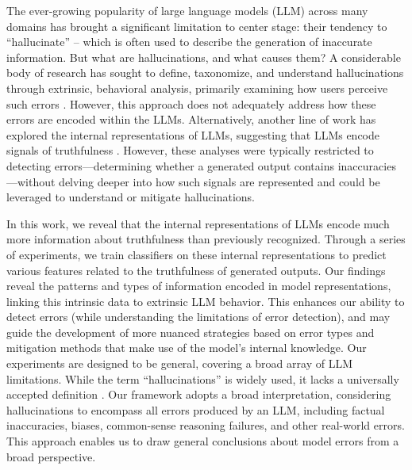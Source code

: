 The ever-growing popularity of large language models (LLM) across many domains has brought a significant limitation to center stage: their tendency to ``hallucinate'' -- which is often used to describe the generation of inaccurate information.
But what are hallucinations, and what causes them?
A considerable body of research has sought to define, taxonomize, and understand hallucinations through extrinsic, behavioral analysis, primarily examining how users perceive such errors \citep{bang2023multitask, ji2023survey, huang2023survey, rawte2023troubling}.
However, this approach does not adequately address how these errors are encoded within the LLMs.
Alternatively, another line of work has explored the internal representations of LLMs, suggesting that LLMs encode signals of truthfulness \citep[\textit{inter alia}]{kadavath2022language, li2024inference, chen2024inside}.
However, these analyses were typically restricted to detecting errors---determining whether a generated output contains inaccuracies---without delving deeper into how such signals are represented and could be leveraged to understand or mitigate hallucinations.

In this work, we reveal that the internal representations of LLMs encode much more information about truthfulness than previously recognized.
Through a series of experiments, we train classifiers on these internal representations to predict various features related to the truthfulness of generated outputs.
Our findings reveal the patterns and types of information encoded in model representations, linking this intrinsic data to extrinsic LLM behavior.
This enhances our ability to detect errors (while understanding the limitations of error detection), and may guide the development of more nuanced strategies based on error types and mitigation methods that make use of the model's internal knowledge.
Our experiments are designed to be general, covering a broad array of LLM limitations.
While the term ``hallucinations'' is widely used, it lacks a universally accepted definition \citep{venkit2024confidently}.
Our framework adopts a broad interpretation, considering hallucinations to encompass all errors produced by an LLM, including factual inaccuracies, biases, common-sense reasoning failures, and other real-world errors.
This approach enables us to draw general conclusions about model errors from a broad perspective.

